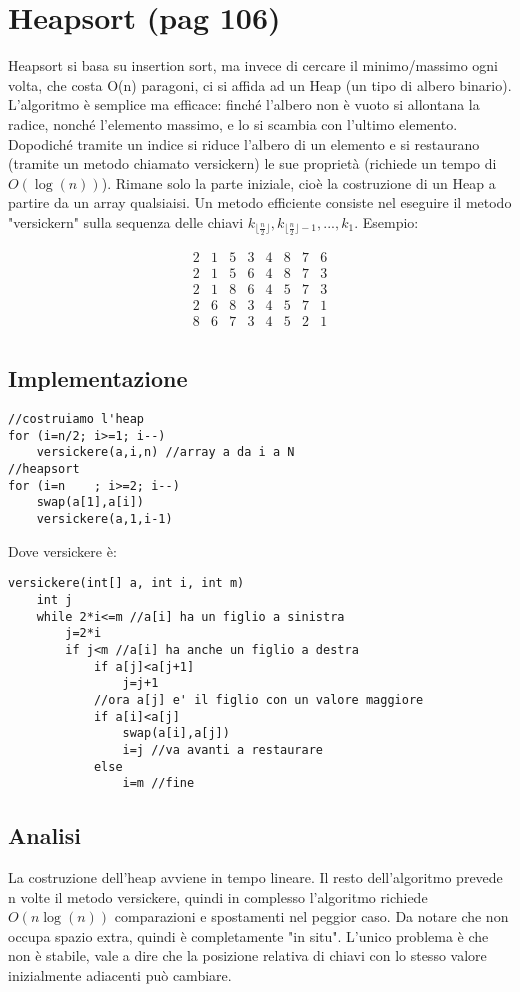 \documentclass[a4paper]{book}
\begin{document}
\section{Heapsort (pag 106)}
Heapsort si basa su insertion sort, ma invece di cercare il minimo/massimo ogni volta, che costa O(n) paragoni, ci si affida ad un Heap (un tipo di albero binario). L'algoritmo è semplice ma efficace: finché l'albero non è vuoto si allontana la radice, nonché l'elemento massimo, e lo si scambia con l'ultimo elemento. Dopodiché tramite un indice si riduce l'albero di un elemento e si restaurano (tramite un metodo chiamato versickern) le sue proprietà (richiede un tempo di $O(\log (n))$). Rimane solo la parte iniziale, cioè la costruzione di un Heap a partire da un array qualsiaisi. Un metodo efficiente consiste nel eseguire il metodo "versickern" sulla sequenza delle chiavi $k_{\lfloor \frac{n}{2} \rfloor}, k_{\lfloor \frac{n}{2} \rfloor - 1}, ... , k_1$. Esempio:

\[\begin{array}{*{20}{c}}
{2}&1&{5}&{3}&4&8&7&6\\
2&{1}&{5}&{6}&4&8&7&3\\
2&{1}&{8}&{6}&4&5&7&3\\
2&{6}&{8}&3&{4}&5&7&1\\
8&{6}&7&{3}&{4}&5&2&1\\
\end{array}\]

\subsection*{Implementazione}
\begin{lstlisting}
//costruiamo l'heap
for (i=n/2; i>=1; i--)
	versickere(a,i,n) //array a da i a N
//heapsort	
for (i=n	; i>=2; i--)
	swap(a[1],a[i])
	versickere(a,1,i-1)
\end{lstlisting}                                                                          
Dove versickere è:
\begin{lstlisting}
versickere(int[] a, int i, int m)
	int j
	while 2*i<=m //a[i] ha un figlio a sinistra
		j=2*i
		if j<m //a[i] ha anche un figlio a destra
			if a[j]<a[j+1]
				j=j+1
			//ora a[j] e' il figlio con un valore maggiore
			if a[i]<a[j]
				swap(a[i],a[j])
				i=j //va avanti a restaurare
			else
				i=m //fine		
\end{lstlisting}                                                                                                 
\subsection*{Analisi}
La costruzione dell'heap avviene in tempo lineare. Il resto dell'algoritmo prevede n volte il metodo versickere, quindi in complesso l'algoritmo richiede $O(n \log (n))$ comparazioni e spostamenti nel peggior caso. Da notare che non occupa spazio extra, quindi è completamente "in situ". L'unico problema è che non è stabile, vale a dire che la posizione relativa di chiavi con lo stesso valore inizialmente adiacenti può cambiare. 
\end{document}

